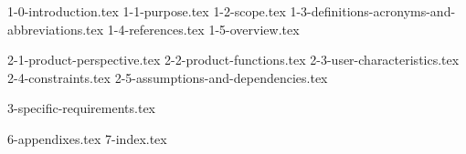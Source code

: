 \documentclass{requisitos-ieee}
\begin{document}
{1-0-introduction.tex}
{1-1-purpose.tex}
{1-2-scope.tex}
{1-3-definitions-acronyms-and-abbreviations.tex}
{1-4-references.tex}
{1-5-overview.tex}

{2-1-product-perspective.tex}
{2-2-product-functions.tex}
{2-3-user-characteristics.tex}
{2-4-constraints.tex}
{2-5-assumptions-and-dependencies.tex}

{3-specific-requirements.tex}


{6-appendixes.tex}
{7-index.tex}
\end{document}
